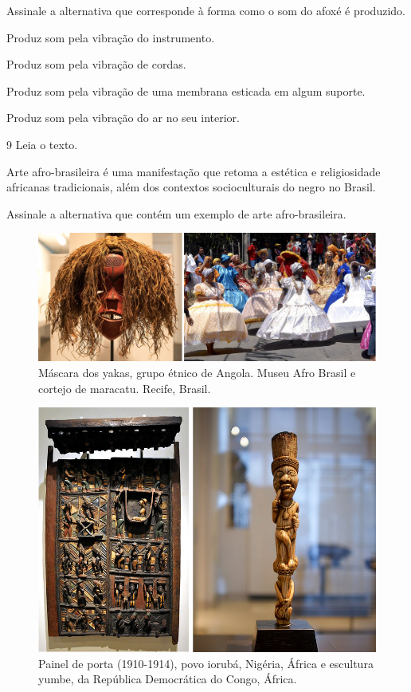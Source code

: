 Assinale a alternativa que corresponde à forma como o som do afoxé é
produzido.

\begin{escolha}
\item
  Produz som pela vibração do instrumento.
\item
  Produz som pela vibração de cordas.
\item
  Produz som pela vibração de uma membrana esticada em algum suporte.
\item
  Produz som pela vibração do ar no seu interior.
\end{escolha}



\num{9}  Leia o texto.

\begin{myquote}
Arte afro-brasileira é uma manifestação que retoma a estética e religiosidade africanas tradicionais, além dos contextos socioculturais do negro no Brasil.
\end{myquote}

Assinale a alternativa que contém um exemplo de arte afro-brasileira.

\begin{figure}[htpb!]
\includegraphics[width=.7\textwidth]{./imgs/art34ab.png}
\caption{Máscara dos yakas, grupo étnico de Angola. Museu Afro Brasil e cortejo de maracatu. Recife, Brasil.}
\end{figure}

\begin{figure}[htpb!]
\includegraphics[width=.7\textwidth]{./imgs/art34cd.png}
\caption{Painel de porta (1910-1914), povo iorubá, Nigéria, África e escultura yumbe, da República Democrática do Congo, África.}
\end{figure}


